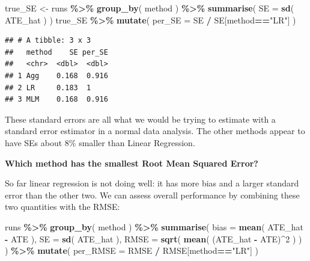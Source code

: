 \documentclass[
]{book}
\newenvironment{Shaded}{\begin{snugshade}}{\end{snugshade}}
\newcommand{\AttributeTok}[1]{\textcolor[rgb]{0.13,0.29,0.53}{#1}}
\newcommand{\DecValTok}[1]{\textcolor[rgb]{0.00,0.00,0.81}{#1}}
\newcommand{\FunctionTok}[1]{\textcolor[rgb]{0.13,0.29,0.53}{\textbf{#1}}}
\newcommand{\NormalTok}[1]{#1}
\newcommand{\OtherTok}[1]{\textcolor[rgb]{0.56,0.35,0.01}{#1}}
\newcommand{\SpecialCharTok}[1]{\textcolor[rgb]{0.81,0.36,0.00}{\textbf{#1}}}
\newcommand{\StringTok}[1]{\textcolor[rgb]{0.31,0.60,0.02}{#1}}
\begin{document}
\begin{Shaded}
\begin{Highlighting}[]
\NormalTok{true\_SE }\OtherTok{\textless{}{-}}\NormalTok{ runs }\SpecialCharTok{\%\textgreater{}\%} 
  \FunctionTok{group\_by}\NormalTok{( method ) }\SpecialCharTok{\%\textgreater{}\%}
  \FunctionTok{summarise}\NormalTok{( }
    \AttributeTok{SE =} \FunctionTok{sd}\NormalTok{( ATE\_hat )}
\NormalTok{  )}
\NormalTok{true\_SE }\SpecialCharTok{\%\textgreater{}\%}
  \FunctionTok{mutate}\NormalTok{( }\AttributeTok{per\_SE =}\NormalTok{ SE }\SpecialCharTok{/}\NormalTok{ SE[method}\SpecialCharTok{==}\StringTok{"LR"}\NormalTok{] )}
\end{Highlighting}
\end{Shaded}

\begin{verbatim}
## # A tibble: 3 x 3
##   method    SE per_SE
##   <chr>  <dbl>  <dbl>
## 1 Agg    0.168  0.916
## 2 LR     0.183  1    
## 3 MLM    0.168  0.916
\end{verbatim}

These standard errors are all what we would be trying to estimate with a standard error estimator in a normal data analysis.
The other methods appear to have SEs about 8\% smaller than Linear Regression.

\textbf{Which method has the smallest Root Mean Squared Error?}

So far linear regression is not doing well: it has more bias and a larger standard error than the other two.
We can assess overall performance by combining these two quantities with the RMSE:

\begin{Shaded}
\begin{Highlighting}[]
\NormalTok{runs }\SpecialCharTok{\%\textgreater{}\%} 
  \FunctionTok{group\_by}\NormalTok{( method ) }\SpecialCharTok{\%\textgreater{}\%}
  \FunctionTok{summarise}\NormalTok{( }
    \AttributeTok{bias =} \FunctionTok{mean}\NormalTok{( ATE\_hat }\SpecialCharTok{{-}}\NormalTok{ ATE ),}
    \AttributeTok{SE =} \FunctionTok{sd}\NormalTok{( ATE\_hat ),}
    \AttributeTok{RMSE =} \FunctionTok{sqrt}\NormalTok{( }\FunctionTok{mean}\NormalTok{( (ATE\_hat }\SpecialCharTok{{-}}\NormalTok{ ATE)}\SpecialCharTok{\^{}}\DecValTok{2}\NormalTok{ ) )}
\NormalTok{  ) }\SpecialCharTok{\%\textgreater{}\%}
  \FunctionTok{mutate}\NormalTok{( }\AttributeTok{per\_RMSE =}\NormalTok{ RMSE }\SpecialCharTok{/}\NormalTok{ RMSE[method}\SpecialCharTok{==}\StringTok{"LR"}\NormalTok{] )}
\end{Highlighting}
\end{Shaded}
\end{document}
